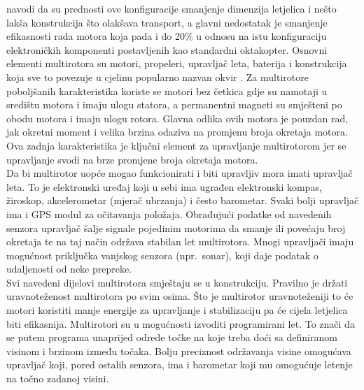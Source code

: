 \documentclass[times, utf8, diplomski]{fer}
\begin{document}
\citet{Zilic}  navodi  da su  prednosti  ove konfiguracije smanjenje dimenzija letjelica i nešto lakša konstrukcija što olakšava transport, a glavni nedostatak je smanjenje efikasnosti rada motora koja pada i do 20\% u odnosu na istu konfiguraciju  elektroničkih  komponenti  postavljenih  kao  standardni  oktakopter.  Osnovni elementi  multirotora  su  motori,  propeleri, upravljač leta,  baterija  i  konstrukcija  koja  sve  to povezuje   u   cjelinu   popularno   nazvan   okvir   .  Za  multirotore  poboljšanih karakteristika koriste se motori bez četkica gdje su namotaji u središtu motora i imaju ulogu statora, a permanentni magneti su smješteni po obodu motora i imaju ulogu rotora. Glavna odlika ovih motora je pouzdan rad, jak okretni moment i velika brzina odaziva na promjenu broja okretaja motora. Ova zadnja karakteristika je ključni element za upravljanje multirotorom jer se upravljanje svodi na brze promjene broja okretaja motora.\\
Da bi multirotor uopće mogao funkcionirati i biti upravljiv mora imati upravljač leta. To je elektronski uređaj koji u sebi ima ugrađen elektronski kompas, žiroskop, akcelerometar (mjerač ubrzanja) i često barometar. Svaki bolji upravljač ima i GPS  modul za očitavanja položaja. Obrađujući podatke od navedenih senzora upravljač šalje signale pojedinim motorima da smanje ili povećaju broj okretaja te na taj način održava stabilan let  multirotora.  Mnogi upravljači imaju mogućnost priključka vanjskog senzora  (npr.~sonar), koji daje podatak o udaljenosti od neke prepreke. \citep{Zilic}\\
Svi navedeni dijelovi multirotora smještaju se u konstrukciju. Pravilno je držati uravnoteženost multirotora po svim osima. Što je multirotor uravnoteženiji to će motori koristiti manje energije za upravljanje i stabilizaciju pa će cijela letjelica biti efikasnija. Multirotori su u mogućnosti izvoditi programirani let. To znači da se putem programa unaprijed odrede točke na koje treba doći sa definiranom visinom i brzinom između točaka. Bolju preciznost održavanja visine omogućava upravljač koji, pored  ostalih  senzora, ima i  barometar koji mu omogućuje letenje na  točno zadanoj  visini. \citep{Zilic}\\
\end{document}
